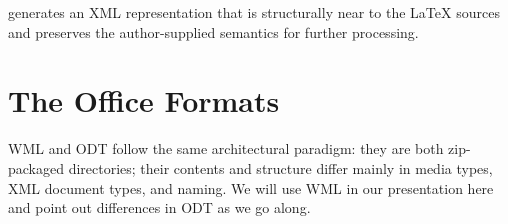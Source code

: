 \documentclass{article}
\begin{document}
 generates an XML representation that is structurally near to the
{\LaTeX} sources and preserves the author-supplied semantics for further processing.

\section{The Office Formats}\label{sec:target}

WML and ODT follow the same architectural paradigm: they are both zip-packaged
directories; their contents and structure differ mainly in media types, XML document
types, and naming. We will use WML in our presentation here and point out differences in
ODT as we go along.
\end{document}
